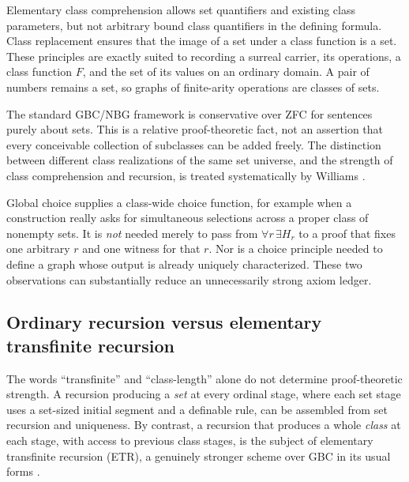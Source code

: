 \documentclass[11pt,letterpaper]{article}
\numberwithin{equation}{section}
\theoremstyle{definition}
\theoremstyle{remark}
\begin{document}
Elementary class comprehension allows set quantifiers and existing class parameters, but not arbitrary bound class quantifiers in the defining formula. Class replacement ensures that the image of a set under a class function is a set. These principles are exactly suited to recording a surreal carrier, its operations, a class function $F$, and the set of its values on an ordinary domain. A pair of numbers remains a set, so graphs of finite-arity operations are classes of sets.

The standard GBC/NBG framework is conservative over ZFC for sentences purely about sets. This is a relative proof-theoretic fact, not an assertion that every conceivable collection of subclasses can be added freely. The distinction between different class realizations of the same set universe, and the strength of class comprehension and recursion, is treated systematically by Williams \cite{Williams}.

Global choice supplies a class-wide choice function, for example when a construction really asks for simultaneous selections across a proper class of nonempty sets. It is \emph{not} needed merely to pass from $\forall r\,\exists H_r$ to a proof that fixes one arbitrary $r$ and one witness for that $r$. Nor is a choice principle needed to define a graph whose output is already uniquely characterized. These two observations can substantially reduce an unnecessarily strong axiom ledger.

\subsection{Ordinary recursion versus elementary transfinite recursion}\label{subsec:recursion}
The words ``transfinite'' and ``class-length'' alone do not determine proof-theoretic strength. A recursion producing a \emph{set} at every ordinal stage, where each set stage uses a set-sized initial segment and a definable rule, can be assembled from set recursion and uniqueness. By contrast, a recursion that produces a whole \emph{class} at each stage, with access to previous class stages, is the subject of elementary transfinite recursion (ETR), a genuinely stronger scheme over GBC in its usual forms \cite{GitmanHamkins,ClassForcing}.
\end{document}

